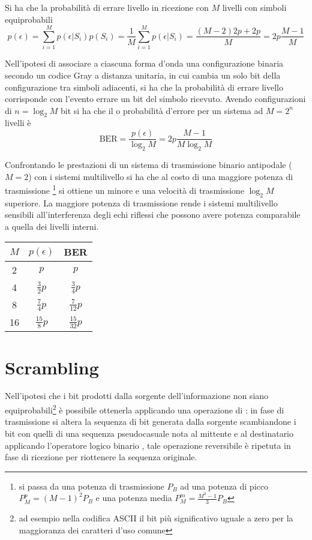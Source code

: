 Si ha che la probabilità di errare livello in ricezione con $M$ livelli con simboli equiprobabili
\begin{equation}
p(\epsilon)=\sum_{i=1}^{M}p(\epsilon|S_i)p(S_i)=\frac{1}{M}\sum_{i=1}^{M}p(\epsilon|S_i)=\frac{(M-2)2p+2p}{M}=2p\frac{M-1}{M}
\end{equation}

Nell'ipotesi di associare a ciascuna forma d'onda una configurazione binaria secondo un codice Gray a distanza unitaria, in cui cambia un solo bit della configurazione tra simboli adiacenti, si ha che la probabilità di errare livello corrisponde con l'evento errare un bit del simbolo ricevuto. Avendo configurazioni di $n=\log_2{M}$ bit si ha che il  o probabilità d'errore per un sistema ad $M=2^n$ livelli è
\begin{equation}
\text{BER}=\frac{p(\epsilon)}{\log_2{M}}=2p\frac{M-1}{M\log_2{M}}
\end{equation}

Confrontando le prestazioni di un sistema di trasmissione binario antipodale ($M=2$) con i sistemi multilivello si ha che al costo di una maggiore potenza di trasmissione \footnote{si passa da una potenza di trasmissione $P_B$ ad una potenza di picco $P_M^p=(M-1)^2 P_B$ e una potenza media $P_M^m=\frac{M^2-1}{3}P_B$} si ottiene un minore  e una velocità di trasmissione $\log_2{M}$ superiore. La maggiore potenza di trasmissione rende i sistemi multilivello sensibili all'interferenza degli echi riflessi che possono avere potenza comparabile a quella dei livelli interni.
\begin{table}[ht]
\centering
\begin{tabular}{ccc}
$M$ & $p(\epsilon)$ & BER \\ \hline
2	& $p$ & $p$ \\
4	& $\frac{3}{2}p$ & $\frac{3}{4}p$ \\
8	& $\frac{7}{4}p$ & $\frac{7}{12}p$ \\
16	& $\frac{15}{8}p$ & $\frac{15}{32}p$ \\
\end{tabular}
\end{table}

\section{Scrambling}
Nell'ipotesi che i bit prodotti dalla sorgente dell'informazione non siano equiprobabili\footnote{ad esempio nella codifica ASCII il bit più significativo uguale a zero per la maggioranza dei caratteri d'uso comune} è possibile ottenerla applicando una operazione di : in fase di trasmissione si altera la sequenza di bit generata dalla sorgente scambiandone i bit con quelli di una sequenza pseudocasuale nota al mittente e al destinatario applicando l'operatore logico binario , tale operazione reversibile è ripetuta in fase di ricezione per riottenere la sequenza originale.

